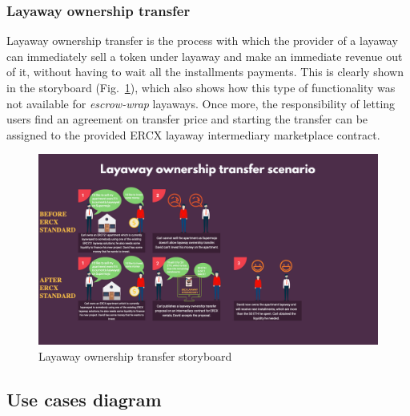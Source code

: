 \documentclass[english, LaM, oneside]{sapthesis}%
\begin{document}
\subsubsection{Layaway ownership transfer}
Layaway ownership transfer is the process with which the provider of a layaway can immediately sell a token under layaway and make an immediate revenue out of it, without having to wait all the installments payments. This is clearly shown in the storyboard (Fig.~\ref{fig:LayawayOwnershipTransfer SB}), which also shows how this type of functionality was not available for \textit{escrow-wrap} layaways. \newline
Once more, the responsibility of letting users find an agreement on transfer price and starting the transfer can be assigned to the provided ERCX layaway intermediary marketplace contract.

\begin{figure}[H]
    \centering
        \begin{adjustbox}{width=1\textwidth}
            \includegraphics{storyboards/layawayTransfer.pdf}
        \end{adjustbox}
    \caption{Layaway ownership transfer storyboard}
    \label{fig:LayawayOwnershipTransfer SB}
\end{figure}

\subsection{Use cases diagram}
\end{document}
